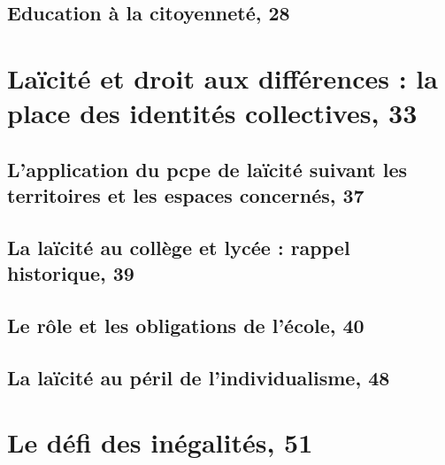 \documentclass[12pt]{report}
\begin{document}
\begin{itemize}

\section{Education à la citoyenneté, 28}


\chapter{Laïcité et droit aux différences : la place des identités collectives, 33}

\section{L'application du pcpe de laïcité suivant les territoires et les espaces concernés, 37}

\section{La laïcité au collège et lycée : rappel historique, 39}

\section{Le rôle et les obligations de l'école, 40}

\section{La laïcité au péril de l'individualisme, 48}

\chapter{Le défi des inégalités, 51}


\end{itemize}
\end{document}
